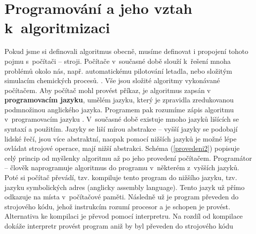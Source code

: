 \documentclass[FP,DP]{tulthesis}
\begin{document}
\section{Programování a jeho vztah k~algoritmizaci}
Pokud jsme si definovali algoritmus obecně, musíme definovat i propojení tohoto pojmu s~počítači -- stroji. Počítače v~současné době slouží k~řešení mnoha problémů okolo nás, např. automatickému pilotování letadla, nebo složitým simulacím chemických procesů.  \citep[s.~49]{spirit}. Vše jsou složité algoritmy vykonávané počítačem. Aby počítač mohl provést příkaz, je algoritmus zapsán v~\textbf{ programovacím jazyku}, umělém jazyku, který je zpravidla zredukovanou podmnožinou anglického jazyka. Programem pak rozumíme zápis algoritmu v~programovacím jazyku \citep[s.~6]{motycka}. V~současné době existuje mnoho jazyků lišících se syntaxí a použitím. Jazyky se liší mírou abstrakce -- vyšší jazyky se podobají lidské řečí, jsou více abstraktní, naopak pomocí nižších jazyků je možné lépe ovládat strojové operace, mají nižší abstrakci.  Schéma (\ref{provedeni2}) popisuje celý princip od myšlenky algoritmu až po jeho provedení počítačem. Programátor -- člověk naprogramuje algoritmus do programu  v~některém z~vyšších jazyků. Poté si počítač převádí, tzv. kompiluje tento program do nižšího jazyku, tzv. jazyku symbolických adres (anglicky assembly language). Tento jazyk už přímo odkazuje na místa v~počítačové paměti. Následně už je program převeden do strojového kódu, jehož instrukcím rozumí procesor a je schopen je provést. Alternativa ke kompilaci je převod pomocí interpretru. Na rozdíl od kompilace dokáže interpretr provést program aniž by byl převeden do strojového kódu \citep[s.~54-57]{spirit}
\end{document}
